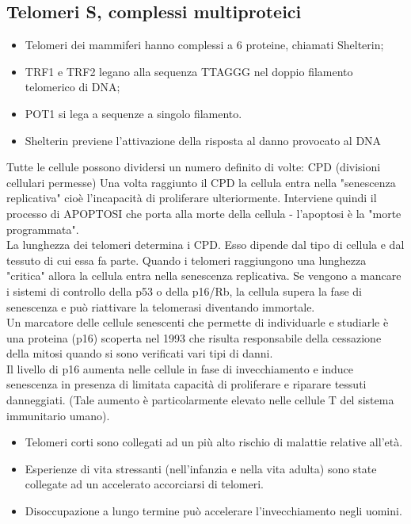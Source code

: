 \documentclass{article}
\begin{document}
\subsection{Telomeri S, complessi multiproteici}
\begin{itemize}
    \item Telomeri dei mammiferi hanno complessi a 6 proteine, chiamati Shelterin;
    \item TRF1 e TRF2 legano alla sequenza TTAGGG nel doppio filamento telomerico di DNA;
    \item POT1 si lega a sequenze a singolo filamento.
    \item Shelterin previene l'attivazione della risposta al danno provocato al DNA
\end{itemize}
Tutte le cellule possono dividersi un numero definito di volte: CPD (divisioni cellulari permesse)
Una volta raggiunto il CPD la cellula entra nella "senescenza replicativa" cioè l'incapacità di proliferare ulteriormente. Interviene quindi il processo di APOPTOSI che porta alla morte della cellula - l'apoptosi è la "morte programmata".\\
La lunghezza dei telomeri determina i CPD. Esso dipende dal tipo di cellula e dal tessuto di cui essa fa parte. Quando i telomeri raggiungono una lunghezza "critica" allora la cellula entra nella senescenza replicativa. Se vengono a mancare i sistemi di controllo della p53 o della p16/Rb, la cellula supera la fase di senescenza e può riattivare la telomerasi diventando immortale.\\
Un marcatore delle cellule senescenti che permette di individuarle e studiarle è una proteina (p16) scoperta nel 1993 che risulta responsabile della cessazione della mitosi quando si sono verificati vari tipi di danni.\\
Il livello di p16 aumenta nelle cellule in fase di invecchiamento e induce senescenza in presenza di limitata capacità di proliferare e riparare tessuti danneggiati. (Tale aumento è particolarmente elevato nelle cellule T del sistema immunitario umano).\\
\begin{itemize}
        \item Telomeri corti sono collegati ad un più alto rischio di malattie relative all'età.
        \item Esperienze di vita stressanti (nell'infanzia e nella vita adulta) sono state collegate ad un accelerato accorciarsi di telomeri.
        \item Disoccupazione a lungo termine può accelerare l'invecchiamento negli uomini.
    \end{itemize}
\end{document}
